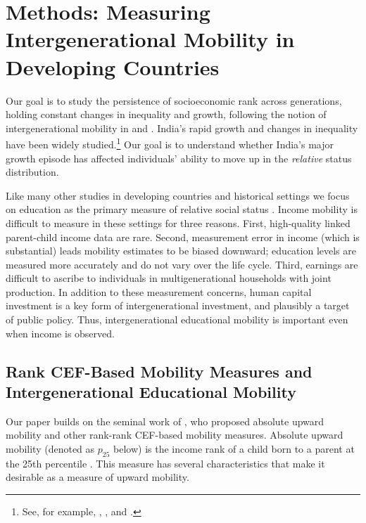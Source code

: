 \documentclass[12pt,letterpaper]{article}
\numberwithin{equation}{section}
\begin{document}
\section{Methods: Measuring Intergenerational Mobility in Developing Countries}
\label{sec:method}

Our goal is to study the persistence of socioeconomic rank across generations, holding constant changes in inequality and growth, following the notion of intergenerational mobility in  and . India's rapid growth and changes in inequality have been widely studied.\footnote{See, for example, , , and .}  Our goal is to understand whether India's major growth episode has affected individuals' ability to move up in the \textit{relative} status distribution.

Like many other studies in developing countries and historical settings we focus on education as the primary measure of relative social status \cite{solon1999,guell2013,wantchekon2015a,alesina2018,card2022,derenoncourt2022}. Income mobility is difficult to measure in these settings for three reasons. First, high-quality linked parent-child income data are rare. Second, measurement error in income (which is substantial) leads mobility estimates to be biased downward; education levels are measured more accurately and do not vary over the life cycle. Third, earnings are difficult to ascribe to individuals in multigenerational households with joint production. In addition to these measurement concerns, human capital investment is a key form of intergenerational investment, and plausibly a target of public policy. Thus, intergenerational educational mobility is important even when income is observed.

\subsection{Rank CEF-Based Mobility Measures and Intergenerational Educational Mobility}
\label{sec:method_bg}

Our paper builds on the seminal work of , who proposed absolute upward mobility and other rank-rank CEF-based mobility measures. Absolute upward mobility (denoted as $p_{25}$ below) is the income rank of a child born to a parent at the 25th percentile \cite{chetty2014c}. This measure has several characteristics that make it desirable as a measure of upward mobility.
\end{document}
